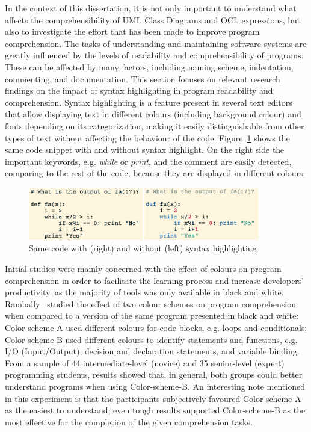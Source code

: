 In the context of this dissertation, it is not only important to understand what affects the comprehensibility of UML Class Diagrams and OCL expressions, but also to investigate the effort that has been made to improve program comprehension. The tasks of understanding and maintaining software systems are greatly influenced by the levels of readability and comprehensibility of programs. These can be affected by many factors, including naming scheme, indentation, commenting, and documentation. This section focuses on relevant research findings on the impact of syntax highlighting in program readability and comprehension. Syntax highlighting is a feature present in several text editors that allow displaying text in different colours (including background colour) and fonts depending on its categorization, making it easily distinguishable from other types of text without affecting the behaviour of the code. Figure~\ref{fig:06_syntaxhighligh1} shows the same code snippet with and without syntax highlight. On the right side the important keywords, e.g. \textit{while} or \textit{print}, and the comment are easily detected, comparing to the rest of the code, because they are displayed in different colours.

\begin{figure}[ht]
\centering
\includegraphics[width=0.9\textwidth]{Chapters/figures/4_RelatedWork/04_SyntaxHighlight1.png}
\caption{Same code with (right) and without (left) syntax highlighting~\cite{Sarkar2015}}
\label{fig:06_syntaxhighligh1}
\end{figure}

Initial studies were mainly concerned with the effect of colours on program comprehension in order to facilitate the learning process and increase developers' productivity, as the majority of tools was only available in black and white. Rambally~\cite{Rambally1986} studied the effect of two colour schemes on program comprehension when compared to a version of the same program presented in black and white: Color-scheme-A used different colours for code blocks, e.g. loops and conditionals; Color-scheme-B used different colours to identify statements and functions, e.g. I/O (Input/Output), decision and declaration statements, and variable binding. From a sample of 44 intermediate-level (novice) and 35 senior-level (expert) programming students, results showed that, in general, both groups could better understand programs when using Color-scheme-B. An interesting note mentioned in this experiment is that the participants subjectively favoured Color-scheme-A as the easiest to understand, even tough results supported Color-scheme-B as the most effective for the completion of the given comprehension tasks.

